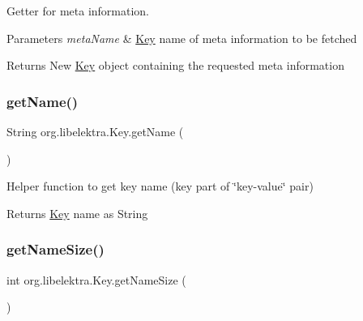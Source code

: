 Getter for meta information. 


\begin{DoxyParams}{Parameters}
{\em meta\+Name} & \hyperlink{classorg_1_1libelektra_1_1Key}{Key} name of meta information to be fetched \\
\hline
\end{DoxyParams}
\begin{DoxyReturn}{Returns}
New \hyperlink{classorg_1_1libelektra_1_1Key}{Key} object containing the requested meta information 
\end{DoxyReturn}
\mbox{\label{classorg_1_1libelektra_1_1Key_a668626c8403940015ff5031cfa5e973c}} 
\subsubsection{\texorpdfstring{get\+Name()}{getName()}}
{\footnotesize\ttfamily String org.\+libelektra.\+Key.\+get\+Name (\begin{DoxyParamCaption}{ }\end{DoxyParamCaption})\hspace{0.3cm}{\ttfamily [inline]}}



Helper function to get key name (key part of \char`\"{}key-\/value\char`\"{} pair) 

\begin{DoxyReturn}{Returns}
\hyperlink{classorg_1_1libelektra_1_1Key}{Key} name as String 
\end{DoxyReturn}
\mbox{\label{classorg_1_1libelektra_1_1Key_aa6477bb5eb12f739858f285650816cc6}} 
\subsubsection{\texorpdfstring{get\+Name\+Size()}{getNameSize()}}
{\footnotesize\ttfamily int org.\+libelektra.\+Key.\+get\+Name\+Size (\begin{DoxyParamCaption}{ }\end{DoxyParamCaption})\hspace{0.3cm}{\ttfamily [inline]}}



